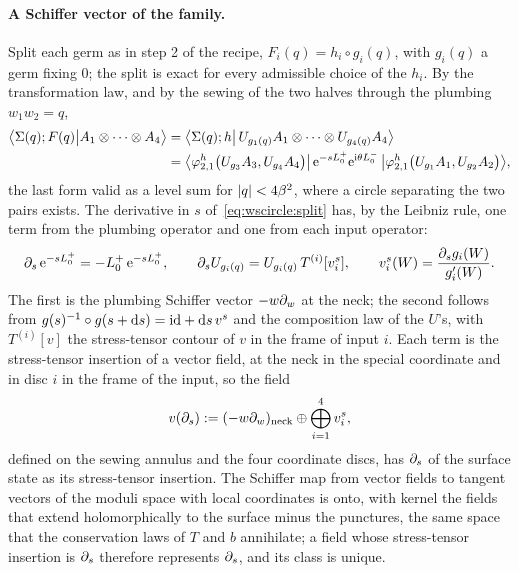 \paragraph{A Schiffer vector of the family.}
Split each germ as in step 2 of the recipe, $F_i(q) = h_i \circ g_i(q)$, with $g_i(q)$ a germ fixing $0$; the split is exact for every admissible choice of the $h_i$.
By the transformation law, and by the sewing of the two halves through the plumbing $w_1 w_2 = q$,
\begin{align}
  \label{eq:wscircle:split}
  \big\langle \Sigma(q); F(q) \big| A_1 \otimes \cdots \otimes A_4 \big\rangle
    &
    = \big\langle \Sigma(q); h \big| \, U_{g_1(q)} A_1 \otimes \cdots \otimes U_{g_4(q)} A_4 \big\rangle
  \\
    &
    = \big\langle \varphi^h_{2,1} \big( U_{g_3} A_3, U_{g_4} A_4 \big) \big| \, \mathrm{e}^{- s L_0^+} \mathrm{e}^{\mathrm{i} \theta L_0^-} \, \big| \varphi^h_{2,1} \big( U_{g_1} A_1, U_{g_2} A_2 \big) \big\rangle,
  \nonumber
\end{align}
the last form valid as a level sum for ${|q|} < 4 \beta^2$, where a circle separating the two pairs exists.
The derivative in $s$ of~\eqref{eq:wscircle:split} has, by the Leibniz rule, one term from the plumbing operator and one from each input operator:
\begin{equation}
  \label{eq:wscircle:leibniz}
  \partial_s \, \mathrm{e}^{- s L_0^+}
    = - L_0^+ \, \mathrm{e}^{- s L_0^+},
  \qquad
  \partial_s U_{g_i(q)}
    = U_{g_i(q)} \, T^{(i)}[v_i^s],
  \qquad
  v_i^s(W)
    = \frac{\partial_s g_i(W)}{g_i'(W)}.
\end{equation}
The first is the plumbing Schiffer vector $- w \partial_w$ at the neck; the second follows from $g(s)^{-1} \circ g(s + \mathrm{d} s) = \mathrm{id} + \mathrm{d} s \, v^s$ and the composition law of the $U$'s, with $T^{(i)}[v]$ the stress-tensor contour of $v$ in the frame of input $i$.
Each term is the stress-tensor insertion of a vector field, at the neck in the special coordinate and in disc $i$ in the frame of the input, so the field
\begin{equation}
  v(\partial_s)
    := (- w \partial_w)_{\mathrm{neck}} \oplus \bigoplus_{i = 1}^4 v_i^s,
\end{equation}
defined on the sewing annulus and the four coordinate discs, has $\partial_s$ of the surface state as its stress-tensor insertion.
The Schiffer map from vector fields to tangent vectors of the moduli space with local coordinates is onto, with kernel the fields that extend holomorphically to the surface minus the punctures, the same space that the conservation laws of $T$ and $b$ annihilate; a field whose stress-tensor insertion is $\partial_s$ therefore represents $\partial_s$, and its class is unique.
